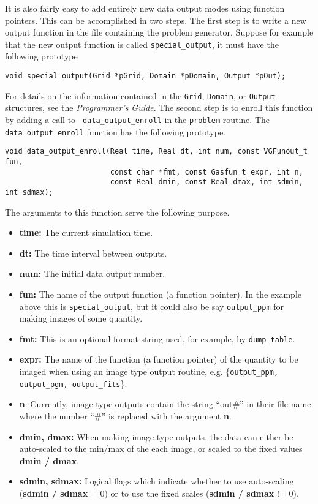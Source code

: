 It is also fairly easy to add entirely new data output modes using
function pointers. This can be accomplished in two steps.
The first step is to write a new output function in the file
containing the problem generator.  Suppose for example that the new
output function is called {\tt special\_output}, it must have the
following prototype
\begin{verbatim}
void special_output(Grid *pGrid, Domain *pDomain, Output *pOut);
\end{verbatim}
For details on the information contained in the {\tt Grid}, {\tt Domain},
or {\tt Output} structures, see the {\it Programmer's Guide}.  The second step
is to enroll this function by adding a call to {\tt
data\_output\_enroll} in the {\tt problem} routine.  The {\tt
data\_output\_enroll} function has the following prototype.
\begin{verbatim}
void data_output_enroll(Real time, Real dt, int num, const VGFunout_t fun,
                        const char *fmt, const Gasfun_t expr, int n,
                        const Real dmin, const Real dmax, int sdmin, int sdmax);
\end{verbatim}
The arguments to this function serve the following purpose.
\begin{itemize}

\item {\bf time:} The current simulation time.

\item {\bf dt:} The time interval between outputs.

\item {\bf num:} The initial data output number.

\item {\bf fun:} The name of the output function (a function pointer).  In
  the example above this is {\tt special\_output}, but it could also
  be say {\tt output\_ppm} for making images of some quantity.

\item {\bf fmt:} This is an optional format string used, for example,
  by {\tt dump\_table}.

\item {\bf expr:} The name of the function (a function pointer) of the
  quantity to be imaged when using an image type output routine,
  e.g. \{{\tt output\_ppm, output\_pgm, output\_fits}\}.

\item {\bf n}: Currently, image type outputs contain the string ``out\#'' 
in their file-name where the number ``\#'' is replaced with the argument 
{\bf n}.

\item {\bf dmin, dmax:} When making image type outputs, the data can 
either be auto-scaled to the min/max of the each image, or scaled to
the fixed values {\bf dmin / dmax}.

\item {\bf sdmin, sdmax:} Logical flags which indicate whether to use
auto-scaling ({\bf sdmin / sdmax} = 0) or to use the fixed scales
({\bf sdmin / sdmax} != 0).

\end{itemize}

